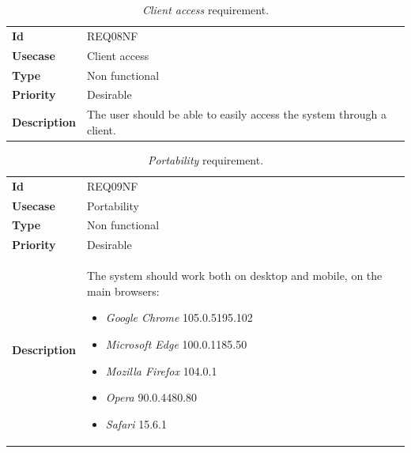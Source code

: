 \begin{table}[h!t]
    \centering
    \caption{\emph{Client access} requirement.}
    \label{tab:req:access:client}
    \centering
    \begin{tabular}{l | p{80mm}}
        \textbf{Id}          & REQ08NF                                                               \\
        \textbf{Usecase}     & Client access                                                         \\
        \textbf{Type}        & Non functional                                                        \\
        \textbf{Priority}    & Desirable                                                             \\
        \textbf{Description} & The user should be able to easily access the system through a client.
    \end{tabular}
\end{table}

\begin{table}[h!t]
    \centering
    \caption{\emph{Portability} requirement.}
    \label{tab:req:portability}
    \centering
    \begin{tabular}{l | p{80mm}}
        \textbf{Id}          & REQ09NF                                                                  \\
        \textbf{Usecase}     & Portability                                                              \\
        \textbf{Type}        & Non functional                                                           \\
        \textbf{Priority}    & Desirable                                                                \\
        \textbf{Description} & The system should work both on desktop and mobile, on the main browsers:
        \begin{itemize}
            \item \emph{Google Chrome} 105.0.5195.102
            \item \emph{Microsoft Edge} 100.0.1185.50
            \item \emph{Mozilla Firefox} 104.0.1
            \item \emph{Opera} 90.0.4480.80
            \item \emph{Safari} 15.6.1
        \end{itemize}
    \end{tabular}
\end{table}

